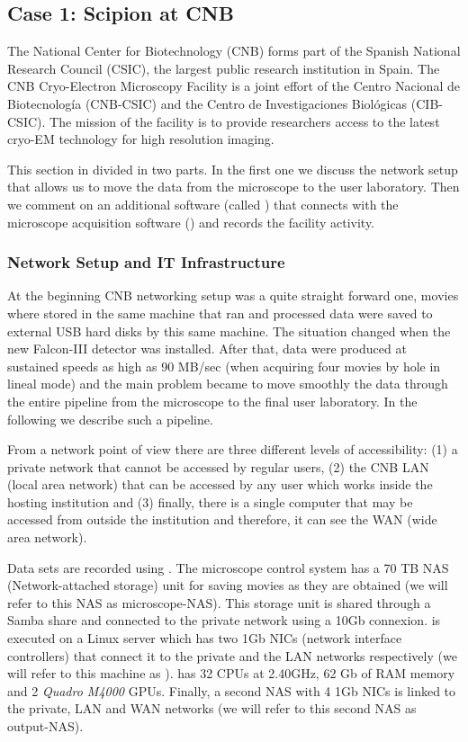 \subsection{Case 1: Scipion at CNB}
The National Center for Biotechnology (CNB) forms part of the Spanish National Research Council (CSIC), the largest public research institution in Spain. 
The CNB Cryo-Electron Microscopy Facility is a joint effort of the Centro Nacional de Biotecnolog\'{i}a (CNB-CSIC) and the Centro de Investigaciones Biol\'{o}gicas (CIB-CSIC). The mission of the facility is to provide researchers access to the latest cryo-EM technology for high resolution imaging. 

This section in divided in two parts. In the first one we discuss the network setup that allows us to move the data from the microscope to the user laboratory. Then  we comment on an additional software (called  \emadmin) that connects \scipion with the microscope acquisition software (\epu) and records the facility activity.

\subsubsection{Network Setup and IT Infrastructure}

At the beginning CNB networking setup was a quite straight forward one, movies where stored in the  same machine that ran \scipion and processed data were saved to external USB hard disks by this same machine. The situation changed when the new Falcon-III detector was installed. After that, data were produced at sustained speeds as high as 90 MB/sec (when acquiring four movies by hole in lineal mode) and the main problem became to move smoothly the data through the entire pipeline from the microscope to the final user laboratory. In the following we describe such a pipeline.

From a network point of view there are three different levels of accessibility: (1) a private network that cannot be accessed by regular users, (2) the CNB LAN (local area network)  that can be accessed by any user which works inside the hosting  institution and (3) finally, there is a single computer that may be accessed from outside the institution and therefore, it can see the WAN (wide area network).

Data sets are recorded using \epu. The microscope control system has a 70 TB NAS (Network-attached storage) unit for saving movies as they are obtained (we will refer to this NAS as microscope-NAS). This storage unit is shared through a Samba share and connected to the private network using a 10Gb connexion. \scipion is executed on a Linux server which has two 1Gb NICs (network interface controllers) that connect it to the private and the LAN networks respectively (we will refer to this machine as \scipionbox). \scipionbox has 32 CPUs at 2.40GHz, 62 Gb of RAM memory and 2 \textit{Quadro M4000} GPUs. Finally, a second NAS with 4 1Gb NICs is linked to the private, LAN and WAN networks (we will refer to this second NAS as output-NAS).

